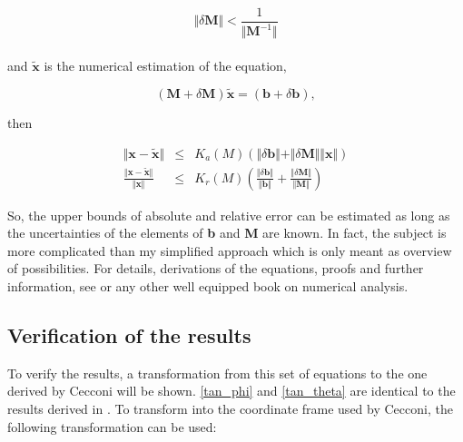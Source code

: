 \documentclass[a4paper,14pt]{extbook}
\begin{document}
\begin{equation}
\Vert \delta \textbf{M} \Vert < \frac{1}{\Vert \textbf{M}^{-1} \Vert }
\end{equation}

\paragraph*{}
and $\tilde{\textbf{x}}$ is the numerical estimation of the equation,

\begin{equation}
(\textbf{M}+\delta \textbf{M})\tilde{\textbf{x}}=(\textbf{b}+\delta \textbf{b}),
\end{equation}

then

\begin{eqnarray}
\Vert \textbf{x} - \tilde{\textbf{x}}\Vert  &\leq & K_a(M) (\Vert \delta \textbf{b} \Vert + \Vert \delta \textbf{M} \Vert \Vert \textbf{x} \Vert )  \\
\frac{\Vert \textbf{x} - \tilde{\textbf{x}}\Vert}{\Vert \textbf{x} \Vert} &\leq & K_r(M) \left( \frac{\Vert \delta \textbf{b} \Vert}{\Vert \textbf{b} \Vert} + \frac{\Vert \delta \textbf{M} \Vert}{\Vert \textbf{M} \Vert} \right)
\end{eqnarray}

So, the upper bounds of absolute and relative error can be estimated as long as the uncertainties of the elements of \textbf{b} and \textbf{M} are known. In fact, the subject is more complicated than my simplified approach which is only meant as overview of possibilities. For details, derivations of the equations, proofs and further information, see \cite{burdenfaires} or any other well equipped book on numerical analysis.

\subsection{Verification of the results}

To verify the results, a transformation from this set of equations to the one derived by Cecconi will be shown. \ref{tan_phi} and \ref{tan_theta} are identical to the results derived in \cite{cecconi04}. To transform into the coordinate frame used by Cecconi, the following transformation can be used:
\end{document}
